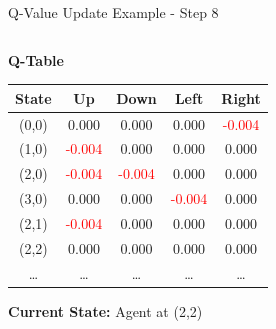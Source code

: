 \documentclass[aspectratio=169]{beamer}
\begin{document}
\begin{frame}{Q-Value Update Example - Step 8}
    
    \begin{columns}
        \begin{column}{0.45\textwidth}
            \textbf{Q-Table}
            \small
            \begin{table}[h]
                \centering
                \begin{tabular}{|c|c|c|c|c|}
                    \hline
                    \textbf{State} & \textbf{Up} & \textbf{Down} & \textbf{Left} & \textbf{Right} \\
                    \hline
                    (0,0) & 0.000 & 0.000 & 0.000 & \textcolor{red}{-0.004} \\
                    (1,0) & \textcolor{red}{-0.004} & 0.000 & 0.000 & 0.000 \\
                    (2,0) & \textcolor{red}{-0.004} & \textcolor{red}{-0.004} & 0.000 & 0.000 \\
                    (3,0) & 0.000 & 0.000 & \textcolor{red}{-0.004} & 0.000 \\
                    (2,1) & \textcolor{red}{-0.004} & 0.000 & 0.000 & 0.000 \\
                    (2,2) & 0.000 & 0.000 & 0.000 & 0.000 \\
                    \dots & \dots & \dots & \dots & \dots \\
                    \hline
                \end{tabular}
            \end{table}
            
            \textbf{Current State:} Agent at (2,2)




\end{column}
\end{columns}
\end{frame}
\end{document}
